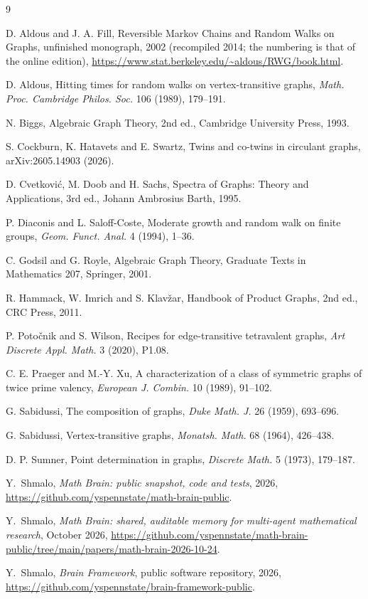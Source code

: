 \documentclass[11pt]{amsart}
\theoremstyle{definition}
\begin{document}
\begin{thebibliography}{9}

 D. Aldous and J. A. Fill, Reversible Markov Chains and Random Walks on Graphs, unfinished monograph, 2002 (recompiled 2014; the numbering is that of the online edition), \url{https://www.stat.berkeley.edu/~aldous/RWG/book.html}.

 D. Aldous, Hitting times for random walks on vertex-transitive graphs, \emph{Math. Proc. Cambridge Philos. Soc.} 106 (1989), 179--191.

 N. Biggs, Algebraic Graph Theory, 2nd ed., Cambridge University Press, 1993.

 S. Cockburn, K. Hatavets and E. Swartz, Twins and co-twins in circulant graphs, arXiv:2605.14903 (2026).

 D. Cvetkovi\'c, M. Doob and H. Sachs, Spectra of Graphs: Theory and Applications, 3rd ed., Johann Ambrosius Barth, 1995.

 P. Diaconis and L. Saloff-Coste, Moderate growth and random walk on finite groups, \emph{Geom. Funct. Anal.} 4 (1994), 1--36.

 C. Godsil and G. Royle, Algebraic Graph Theory, Graduate Texts in Mathematics 207, Springer, 2001.

 R. Hammack, W. Imrich and S. Klav\v{z}ar, Handbook of Product Graphs, 2nd ed., CRC Press, 2011.

 P. Poto\v{c}nik and S. Wilson, Recipes for edge-transitive tetravalent graphs, \emph{Art Discrete Appl. Math.} 3 (2020), P1.08.

 C. E. Praeger and M.-Y. Xu, A characterization of a class of symmetric graphs of twice prime valency, \emph{European J. Combin.} 10 (1989), 91--102.

 G. Sabidussi, The composition of graphs, \emph{Duke Math. J.} 26 (1959), 693--696.

 G. Sabidussi, Vertex-transitive graphs, \emph{Monatsh. Math.} 68 (1964), 426--438.

 D. P. Sumner, Point determination in graphs, \emph{Discrete Math.} 5 (1973), 179--187.

 Y.~Shmalo, \emph{Math Brain: public snapshot, code and tests}, 2026, \url{https://github.com/yspennstate/math-brain-public}.

 Y.~Shmalo, \emph{Math Brain: shared, auditable memory for multi-agent mathematical research}, October 2026, \url{https://github.com/yspennstate/math-brain-public/tree/main/papers/math-brain-2026-10-24}.

 Y.~Shmalo, \emph{Brain Framework}, public software repository, 2026, \url{https://github.com/yspennstate/brain-framework-public}.

\end{thebibliography}
\end{document}
